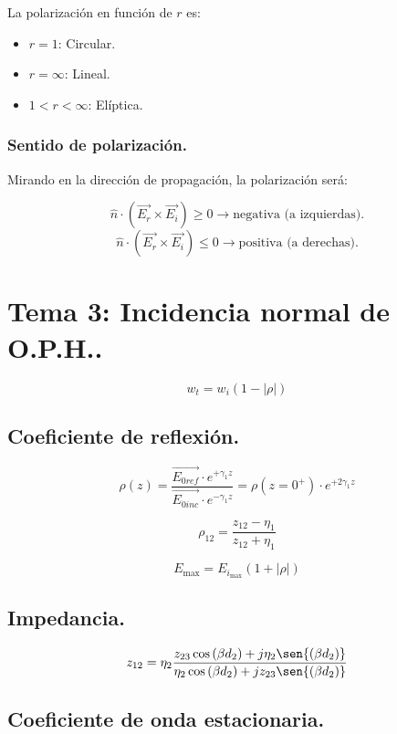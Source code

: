 \documentclass[12pt,a4paper]{article}
\begin{document}
La polarización en función de $r$ es:

\begin{itemize}
    \item $r=1$: Circular.
    \item $r=\infty$: Lineal.
    \item $1<r<\infty$: Elíptica.
\end{itemize}

\subsubsection{Sentido de polarización.}
\label{ssub:sentido_de_polarizacion}

Mirando en la dirección de propagación, la polarización será:

\[ \hat{n} \cdot \left( \vec{E_r} \times \vec{E_i} \right) \geq 0
\rightarrow \mbox{negativa (a izquierdas)}. \]
\[ \hat{n} \cdot \left( \vec{E_r} \times \vec{E_i} \right) \leq 0
\rightarrow \mbox{positiva (a derechas)}. \]

\section{Tema 3: Incidencia normal de O.P.H..}

\[ w_{t} = w_{i} (1 - |\rho|) \]

\subsection{Coeficiente de reflexión.}
\label{sub:coeficiente_de_reflexion}

\[ \rho (z) = \frac{\vec{E_{0 ref}} \cdot e^{+\gamma_1 z}}{\vec{E_{0 inc}}
\cdot e^{-\gamma_1 z}} = \rho (z=0^+) \cdot e^{+2\gamma_1 z} \]

\[ \rho_{12} = \frac{z_{12} - \eta_1}{z_{12} + \eta_1} \]

\[ E_{\max} = E_{i_{\max}} (1 + |\rho|) \]

\subsection{Impedancia.}
\label{sub:impedancia}

\[ z_{12} = \eta_2
\frac{z_{23} \cos{(\beta d_2)} + j \eta_2 \sen{(\beta d_2)}}
{\eta_2 \cos{(\beta d_2)} + j z_{23} \sen{(\beta d_2)}} \]

\subsection{Coeficiente de onda estacionaria.}
\label{sub:coeficiente_de_onda_estacionaria}
\end{document}
